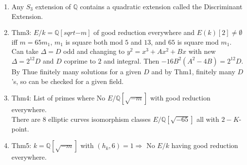 \documentclass{article}
\newcommand{\Q}{\mathbb{Q}}
\newcommand{\Ra}{\Rightarrow}
\begin{document}
\begin{multicols}{2}
\begin{enumerate}
\item Any $S_3$ extension of $\Q$ contains a quadratic extension called the Discriminant Extension. 

\item Thm3: $E/k = \Q[sqrt{-m}]$ of good reduction everywhere and $E(k)[2] \neq \emptyset$ iff $m = 65m_1$, $m_1$ is square both mod $5$ and $13$, and $65$ is square mod $m_1$. 
Can take $\Delta = D$ odd and changing to $y^2 = x^3 + Ax^2 + Bx$ with new $\Delta = 2^{12}D$ and $D$ coprime to $2$ and integral. Then $-16B^2(A^2-4B) = 2^{12}D$. By Thue finitely many solutions for a given $D$ and by Thm1, finitely many $D$'s, so can be checked for a given field. 

\item Thm4: List of primes where No $E/\Q[\sqrt{-m}]$ with good reduction everywhere.\\
There are $8$ elliptic curves isomorphism classes $E/\Q[\sqrt{-65}]$ all with $2-K$-point. 

\item Thm5: $k = \Q[\sqrt{-m}]$ with $(h_k,6) = 1 \Ra$ No $E/k$ having good reduction everywhere. 
\end{enumerate}
\end{multicols}
\end{document}
